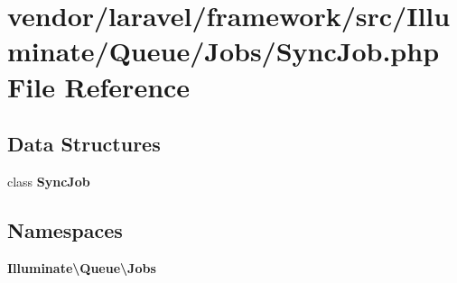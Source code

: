 \section{vendor/laravel/framework/src/\+Illuminate/\+Queue/\+Jobs/\+Sync\+Job.php File Reference}
\label{_sync_job_8php}
\subsection*{Data Structures}
\begin{DoxyCompactItemize}
\item 
class {\bf Sync\+Job}
\end{DoxyCompactItemize}
\subsection*{Namespaces}
\begin{DoxyCompactItemize}
\item 
 {\bf Illuminate\textbackslash{}\+Queue\textbackslash{}\+Jobs}
\end{DoxyCompactItemize}
